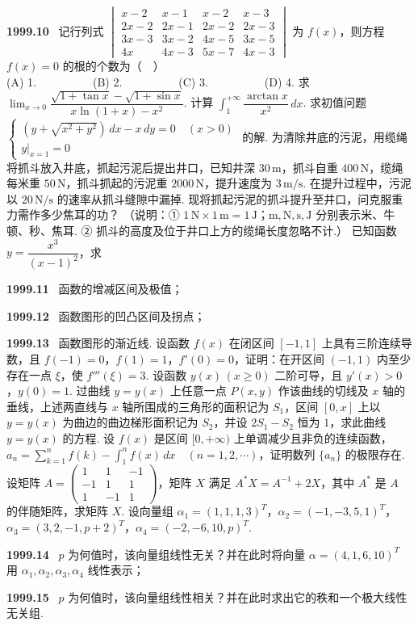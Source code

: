 \documentclass[UTF8,12pt]{ctexart}
\newcommand{\qn}[1]{\textbf{\large #1}\ }
\begin{document}
\vfill
\newpage
\qn{1999.10}
记行列式 $\begin{vmatrix} x - 2 & x - 1 & x - 2 & x - 3 \\ 2x - 2 & 2x - 1 & 2x - 2 & 2x - 3 \\ 3x - 3 & 3x - 2 & 4x - 5 & 3x - 5 \\ 4x & 4x - 3 & 5x - 7 & 4x - 3 \end{vmatrix}$ 为 $f(x)$，则方程 $f(x) = 0$ 的根的个数为（　）
\\
\noindent (A) 1.　　　　　(B) 2.　　　　　(C) 3.　　　　　(D) 4.
求 $\lim_{x \to 0} \dfrac{\sqrt{1 + \tan x} - \sqrt{1 + \sin x}}{x \ln(1 + x) - x^2}$.
计算 $\int_1^{+\infty} \dfrac{\arctan x}{x^2} \, dx$.
求初值问题 $\begin{cases} (y + \sqrt{x^2 + y^2}) \, dx - x \, dy = 0 \quad (x > 0) \\ \left.y\right|_{x=1} = 0 \end{cases}$ 的解.
为清除井底的污泥，用缆绳将抓斗放入井底，抓起污泥后提出井口，已知井深 $30\,\text{m}$，抓斗自重 $400\,\text{N}$，缆绳每米重 $50\,\text{N}$，抓斗抓起的污泥重 $2000\,\text{N}$，提升速度为 $3\,\text{m/s}$. 在提升过程中，污泥以 $20\,\text{N/s}$ 的速率从抓斗缝隙中漏掉. 现将抓起污泥的抓斗提升至井口，问克服重力需作多少焦耳的功？
（说明：① $1\,\text{N} \times 1\,\text{m} = 1\,\text{J}$；$\text{m},\text{N},\text{s},\text{J}$ 分别表示米、牛顿、秒、焦耳. ② 抓斗的高度及位于井口上方的缆绳长度忽略不计.）
已知函数 $y = \dfrac{x^3}{(x - 1)^2}$，求

\vfill
\newpage
\qn{1999.11}
函数的增减区间及极值；

\vfill
\newpage
\qn{1999.12}
函数图形的凹凸区间及拐点；

\vfill
\newpage
\qn{1999.13}
函数图形的渐近线.
设函数 $f(x)$ 在闭区间 $[-1,1]$ 上具有三阶连续导数，且 $f(-1) = 0$，$f(1) = 1$，$f'(0) = 0$，证明：在开区间 $(-1,1)$ 内至少存在一点 $\xi$，使 $f'''(\xi) = 3$.
设函数 $y(x) \, (x \geqslant 0)$ 二阶可导，且 $y'(x) > 0$，$y(0) = 1$. 过曲线 $y = y(x)$ 上任意一点 $P(x,y)$ 作该曲线的切线及 $x$ 轴的垂线，上述两直线与 $x$ 轴所围成的三角形的面积记为 $S_1$，区间 $[0,x]$ 上以 $y = y(x)$ 为曲边的曲边梯形面积记为 $S_2$，并设 $2S_1 - S_2$ 恒为 $1$，求此曲线 $y = y(x)$ 的方程.
设 $f(x)$ 是区间 $[0, +\infty)$ 上单调减少且非负的连续函数，$a_n = \sum_{k=1}^n f(k) - \int_1^n f(x) \, dx \quad (n = 1,2,\cdots)$，证明数列 $\{a_n\}$ 的极限存在.
设矩阵 $A = \begin{pmatrix} 1 & 1 & -1 \\ -1 & 1 & 1 \\ 1 & -1 & 1 \end{pmatrix}$，矩阵 $X$ 满足 $A^* X = A^{-1} + 2X$，其中 $A^*$ 是 $A$ 的伴随矩阵，求矩阵 $X$.
设向量组 $\alpha_1 = (1,1,1,3)^T$，$\alpha_2 = (-1,-3,5,1)^T$，$\alpha_3 = (3,2,-1,p+2)^T$，$\alpha_4 = (-2,-6,10,p)^T$.

\vfill
\newpage
\qn{1999.14}
$p$ 为何值时，该向量组线性无关？并在此时将向量 $\alpha = (4,1,6,10)^T$ 用 $\alpha_1,\alpha_2,\alpha_3,\alpha_4$ 线性表示；

\vfill
\newpage
\qn{1999.15}
$p$ 为何值时，该向量组线性相关？并在此时求出它的秩和一个极大线性无关组.

\vfill
\newpage
\end{document}
